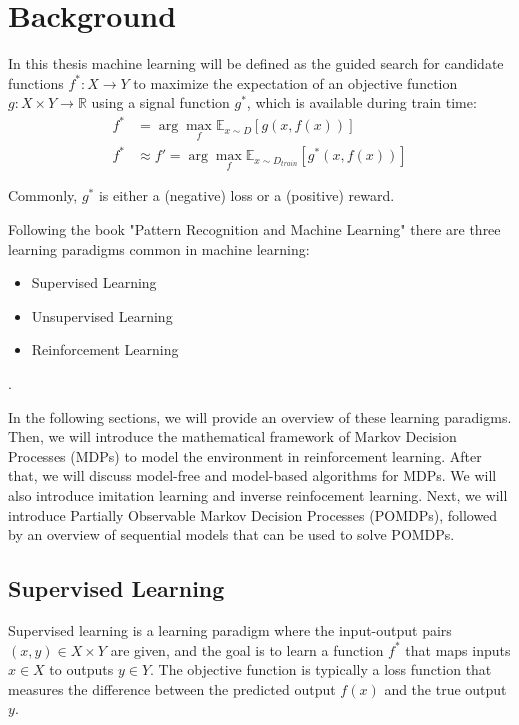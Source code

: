 
\chapter{Background}
\label{chapter:Background}
In this thesis machine learning will be defined as the guided search for candidate functions $f^*: X \to Y$ to maximize the expectation of an objective function 
${g: X \times Y \to \mathbb{R}}$ using a signal function $g^*$, which is available during train time:
\begin{equation}
    \label{general_learning_paradigm}
    \begin{aligned}
        f^* &= \arg\max_{f} \mathbb{E}_{x \sim D}[g(x,f(x))] \\
        f^* &\approx f' = \arg\max_{f} \mathbb{E}_{x \sim D_{train}}[g^*(x,f(x))]
    \end{aligned}
\end{equation}

Commonly, $g^*$ is either a (negative) loss or a (positive) reward.

Following the book "Pattern Recognition and Machine Learning" \cite{bishop} there are three learning paradigms common in machine learning: 
\begin{itemize}
	\item Supervised Learning
	\item Unsupervised Learning
	\item Reinforcement Learning
\end{itemize} .

In the following sections, we will provide an overview of these learning paradigms. 
Then, we will introduce the mathematical framework of Markov Decision Processes (MDPs) to model the environment in reinforcement learning. 
After that, we will discuss model-free and model-based algorithms for MDPs. We will also introduce imitation learning and inverse reinfocement learning. 
Next, we will introduce Partially Observable Markov Decision Processes (POMDPs), followed by an overview of sequential models that can be used 
to solve POMDPs.

\section{Supervised Learning}
\label{section:super_learn}
Supervised learning is a learning paradigm where the input-output pairs $(x,y) \in X \times Y$ are given, and the goal is to learn a function 
$f^*$ that maps inputs $x \in X$ to outputs $y \in Y$. The objective function is typically a loss function that measures the difference between 
the predicted output $f(x)$ and the true output $y$.

